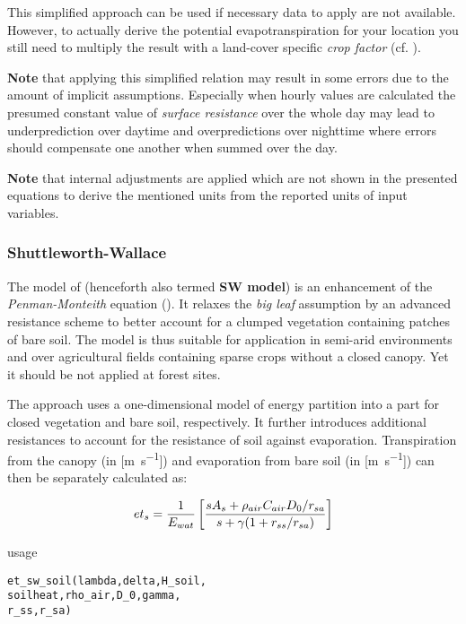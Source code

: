 This simplified approach can be used if necessary data to apply  are not available. However, to actually derive the potential evapotranspiration for your location you still need to multiply the result with a land-cover specific \emph{crop factor} (cf. ).

\textbf{Note} that applying this simplified relation may result in some errors due to the amount of implicit assumptions. Especially when hourly values are calculated the presumed constant value of \emph{surface resistance} over the whole day may lead to underprediction over daytime and overpredictions over nighttime where errors should compensate one another when summed over the day.

\textbf{Note} that internal adjustments are applied which are not shown in the presented equations to derive the mentioned units from the reported units of input variables.


\subsubsection{Shuttleworth-Wallace} \label{sec:et:sw}
The model of \citet{Shuttleworth1985} (henceforth also termed \textbf{SW model}) is an enhancement of the \emph{Penman-Monteith} equation (). It relaxes the \emph{big leaf} assumption by an advanced resistance scheme to better account for a clumped vegetation containing patches of bare soil. The model is thus suitable for application in semi-arid environments and over agricultural fields containing sparse crops without a closed canopy. Yet it should be not applied at forest sites.

The approach uses a one-dimensional model of energy partition into a part for closed vegetation and bare soil, respectively. It further introduces additional resistances to account for the resistance of soil against evaporation. Transpiration from the canopy \etTransp{} (in [\si{\metre\per\second}]) and evaporation from bare soil \etEvap{} (in [\si{\metre\per\second}]) can then be separately calculated as:

\begin{multline} \label{eqn:et:sw_ets}
et_{s} =  \frac{1}{E_{wat}} \left[ \frac{s A_s + \rho_{air} C_{air} D_0 / r_{sa}}{s + \gamma (1 + r_{ss} / r_{sa})} \right]
\end{multline}

\noindent
usage
\begin{verbatim}
et_sw_soil(lambda,delta,H_soil,
soilheat,rho_air,D_0,gamma,
r_ss,r_sa)
\end{verbatim}

